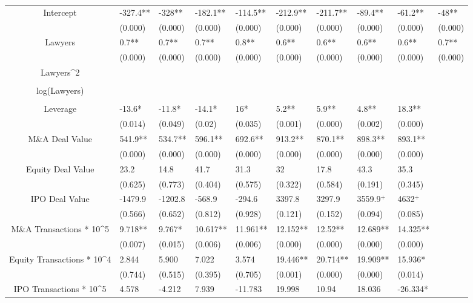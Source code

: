 \documentclass{article}
\begin{document}
\begin{table}[H]
\begin{tabular}{|clllllllll|}
Intercept & -327.4** & -328** & -182.1** & -114.5** & -212.9** & -211.7** & -89.4** & -61.2** & -48** \\ 
   & (0.000) & (0.000) & (0.000) & (0.000) & (0.000) & (0.000) & (0.000) & (0.000) & (0.000) \\ 
  Lawyers & 0.7** & 0.7** & 0.7** & 0.8** & 0.6** & 0.6** & 0.6** & 0.6** & 0.7** \\ 
   & (0.000) & (0.000) & (0.000) & (0.000) & (0.000) & (0.000) & (0.000) & (0.000) & (0.000) \\ 
  Lawyers^2 &  &  &  &  &  &  &  &  &  \\ 
   &  &  &  &  &  &  &  &  &  \\ 
  log(Lawyers) &  &  &  &  &  &  &  &  &  \\ 
   &  &  &  &  &  &  &  &  &  \\ 
  Leverage & -13.6* & -11.8* & -14.1* & 16* & 5.2** & 5.9** & 4.8** & 18.3** &  \\ 
   & (0.014) & (0.049) & (0.02) & (0.035) & (0.001) & (0.000) & (0.002) & (0.000) &  \\ 
  M\&A Deal Value & 541.9** & 534.7** & 596.1** & 692.6** & 913.2** & 870.1** & 898.3** & 893.1** &  \\ 
   & (0.000) & (0.000) & (0.000) & (0.000) & (0.000) & (0.000) & (0.000) & (0.000) &  \\ 
  Equity Deal Value & 23.2 & 14.8 & 41.7 & 31.3 & 32 & 17.8 & 43.3 & 35.3 &  \\ 
   & (0.625) & (0.773) & (0.404) & (0.575) & (0.322) & (0.584) & (0.191) & (0.345) &  \\ 
  IPO Deal Value & -1479.9 & -1202.8 & -568.9 & -294.6 & 3397.8 & 3297.9 & 3559.9$^{+}$ & 4632$^{+}$ &  \\ 
   & (0.566) & (0.652) & (0.812) & (0.928) & (0.121) & (0.152) & (0.094) & (0.085) &  \\ 
  M\&A Transactions * 10^5 & 9.718** & 9.767* & 10.617** & 11.961** & 12.152** & 12.52** & 12.689** & 14.325** &  \\ 
   & (0.007) & (0.015) & (0.006) & (0.006) & (0.000) & (0.000) & (0.000) & (0.000) &  \\ 
  Equity Transactions * 10^4 & 2.844 & 5.900 & 7.022 & 3.574 & 19.446** & 20.714** & 19.909** & 15.936* &  \\ 
   & (0.744) & (0.515) & (0.395) & (0.705) & (0.001) & (0.000) & (0.000) & (0.014) &  \\ 
  IPO Transactions * 10^5 & 4.578 & -4.212 & 7.939 & -11.783 & 19.998 & 10.94 & 18.036 & -26.334* &  \\ 

\end{tabular}
\end{table}
\end{document}
